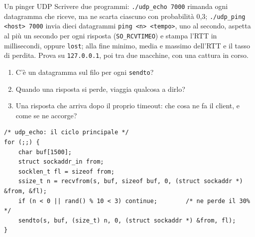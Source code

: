 \begin{esercizio}{Un pinger UDP}
Scrivere due programmi: \texttt{./udp\_echo 7000} rimanda ogni datagramma che riceve, ma ne scarta ciascuno con probabilità 0,3;
\texttt{./udp\_ping <host> 7000} invia dieci datagrammi \texttt{ping <n> <tempo>}, uno al secondo, aspetta al più un secondo per ogni
risposta (\texttt{SO\_RCVTIMEO}) e stampa l'RTT in millisecondi, oppure \texttt{lost}; alla fine minimo, media e massimo dell'RTT e il
tasso di perdita. Prova su \texttt{127.0.0.1}, poi tra due macchine, con una cattura in corso.
\begin{enumerate}[label=(\alph*)]
    \item C'è un datagramma sul filo per ogni \texttt{sendto}?
    \item Quando una risposta si perde, viaggia qualcosa a dirlo?
    \item Una risposta che arriva dopo il proprio timeout: che cosa ne fa il client, e come se ne accorge?
\end{enumerate}

\svolgimento
\begin{lstlisting}[language={[POSIX]C}]
/* udp_echo: il ciclo principale */
for (;;) {
    char buf[1500];
    struct sockaddr_in from;
    socklen_t fl = sizeof from;
    ssize_t n = recvfrom(s, buf, sizeof buf, 0, (struct sockaddr *) &from, &fl);
    if (n < 0 || rand() % 10 < 3) continue;        /* ne perde il 30% */
    sendto(s, buf, (size_t) n, 0, (struct sockaddr *) &from, fl);
}


\end{lstlisting}
\end{esercizio}
